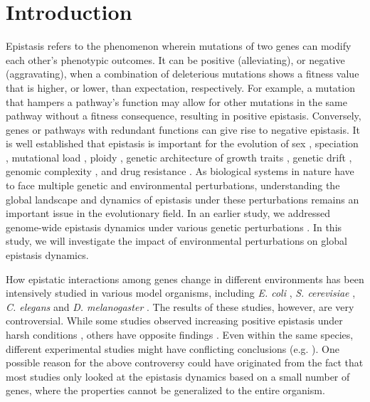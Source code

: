\documentclass[10pt]{article}
\newcommand{\citep}{\cite}
\newcommand{\citet}{\citep}
\begin{document}
\section*{Introduction}


Epistasis refers to the phenomenon wherein mutations of two genes can
modify each other's phenotypic outcomes. It can be positive
(alleviating), or negative (aggravating), when a combination of
deleterious mutations shows a fitness value that is higher, or lower,
than expectation, respectively. For example, a mutation that hampers a
pathway's function may allow for other mutations in the same pathway
without a fitness consequence, resulting in positive
epistasis. Conversely, genes or pathways with redundant functions can
give rise to negative epistasis. It is well established that epistasis
is important for the evolution of sex \citep{Kondrashov1982,
Azevedo2006, Otto2007}, speciation \citep{Presgraves2007}, mutational
load \citep{Hansen2001}, ploidy \citep{Musso2008}, genetic
architecture of growth traits \citep{Xu2011}, genetic drift
\citep{Perez-Figueroa2009}, genomic complexity \citep{Sanjuan2008},
and drug resistance \citep{Trindade2009}. As biological systems in
nature have to face multiple genetic
and environmental perturbations, understanding the global landscape
and dynamics of epistasis under these perturbations remains an
important issue in the evolutionary field. In an earlier study, we
addressed genome-wide epistasis dynamics under various genetic
perturbations \citep{Xu2012}. In this study, we will investigate the impact of
environmental perturbations on global epistasis dynamics.

How epistatic interactions among genes change in different
environments has been intensively studied in various model
organisms, including \textit{E. coli} \citep{Remold2001,
Kishony2003, Cooper2005}, \textit{S. cerevisiae} \citep{Korona1999,
Szafraniec2001, Jasnos2008}, \textit{C. elegans}
\citep{Vassilieva2000, Baer2006} and \textit{D. melanogaster}
\citep{Yang2001, Fry2002, AletheaD.Wang2009}. The results of these
studies, however, are very controversial. While some studies observed
increasing positive epistasis under harsh conditions
\citep{Kishony2003, Jasnos2008, Yang2001}, others have opposite
findings \citep{Cooper2005, Korona1999, Szafraniec2001, Vassilieva2000,
Baer2006, Fry2002, AletheaD.Wang2009, Young2009}. Even within the same
species, different experimental studies might have conflicting
conclusions (e.g. \citet{Kishony2003, Cooper2005}). One possible
reason for the above controversy could have
originated from the fact that most studies only looked at the
epistasis dynamics based on a small number of genes, where the
properties cannot be generalized to the entire organism.
\end{document}
